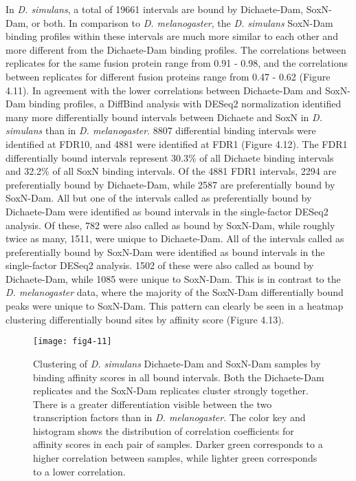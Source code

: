 In \emph{D. simulans}, a total of 19661 intervals are bound by Dichaete-Dam, SoxN-Dam, or both. In comparison to \emph{D. melanogaster}, the \emph{D. simulans} SoxN-Dam binding profiles within these intervals are much more similar to each other and more different from the Dichaete-Dam binding profiles. The correlations between replicates for the same fusion protein range from 0.91 - 0.98, and the correlations between replicates for different fusion proteins range from 0.47 - 0.62 (Figure 4.11). In agreement with the lower correlations between Dichaete-Dam and SoxN-Dam binding profiles, a DiffBind analysis with DESeq2 normalization identified many more differentially bound intervals between Dichaete and SoxN in \emph{D. simulans} than in \emph{D. melanogaster}. 8807 differential binding intervals were identified at FDR10, and 4881 were identified at FDR1 (Figure 4.12). The FDR1 differentially bound intervals represent 30.3\% of all Dichaete binding intervals and 32.2\% of all SoxN binding intervals. Of the 4881 FDR1 intervals, 2294 are preferentially bound by Dichaete-Dam, while 2587 are preferentially bound by SoxN-Dam. All but one of the intervals called as preferentially bound by Dichaete-Dam were identified as bound intervals in the single-factor DESeq2 analysis. Of these, 782 were also called as bound by SoxN-Dam, while roughly twice as many, 1511, were unique to Dichaete-Dam. All of the intervals called as preferentially bound by SoxN-Dam were identified as bound intervals in the single-factor DESeq2 analysis. 1502 of these were also called as bound by Dichaete-Dam, while 1085 were unique to SoxN-Dam. This is in contrast to the \emph{D. melanogaster} data, where the majority of the SoxN-Dam differentially bound peaks were unique to SoxN-Dam. This pattern can clearly be seen in a heatmap clustering differentially bound sites by affinity score (Figure 4.13).\\

\begin{figure}
\centering
\texttt{[image: fig4-11]}
\caption{Clustering of \emph{D. simulans} Dichaete-Dam and SoxN-Dam samples by binding affinity scores in all bound intervals. Both the Dichaete-Dam replicates and the SoxN-Dam replicates cluster strongly together. There is a greater differentiation visible between the two transcription factors than in \emph{D. melanogaster}. The color key and histogram shows the distribution of correlation coefficients for affinity scores in each pair of samples. Darker green corresponds to a higher correlation between samples, while lighter green corresponds to a lower correlation.}
\label{Figure 4.11}
\end{figure}

